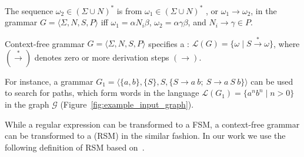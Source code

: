 \begin{definition}
The sequence $\omega_2 \in (\Sigma \cup N)^*$ is  from $\omega_1 \in (\Sigma \cup N)^*$ , or $\omega_1 \to \omega_2$, in the grammar $G = \langle\Sigma, N, S, P\rangle$ iff $\omega_1=\alpha N_i \beta$, $\omega_2 = \alpha \gamma \beta$, and $N_i \to \gamma \in P$.
\end{definition}

\begin{definition}
Context-free grammar $G=\langle\Sigma, N, S, P\rangle$ specifies a : $\mathcal{L}(G) = \{\omega \mid S \xrightarrow{*} \omega \}$, where $(\xrightarrow{*})$ denotes zero or more derivation steps $(\to)$.
\end{definition}

For instance, a grammar $G_1 = \langle \{a,b\}, \{S\}, S, \{S \to a \ b; \ S \to a \ S \ b\} \rangle$ can be used to search for paths, which form words in the language $\mathcal{L}(G_1) = \{a^n b^n \mid n > 0\}$ in the graph $\mathcal{G}$ (Figure~\ref{fig:example_input_graph}).


While a regular expression can be transformed to a FSM, a context-free grammar can be transformed to a  (RSM) in the similar fashion.
In our work we use the following definition of RSM based
on~\cite{rsm:analysis:10.1007/3-540-44585-4_18}.

